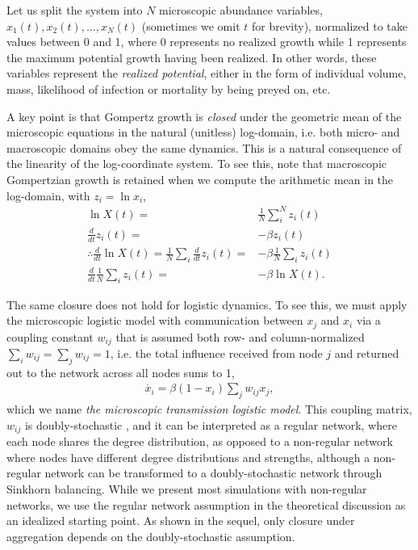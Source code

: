 \documentclass{article}
\begin{document}
Let us split the system into $N$ microscopic abundance variables, $x_1(t), x_2(t), ..., x_N(t)$ (sometimes we omit $t$ for brevity), normalized to take values between 0 and 1, where 0 represents no realized growth while 1 represents the maximum potential growth having been realized. In other words, these variables represent the \textit{realized potential}, either in the form of individual volume, mass, likelihood of infection or mortality by being preyed on, etc. 

A key point is that Gompertz growth is \emph{closed} under the geometric mean of the microscopic equations in the natural (unitless) log-domain, i.e. both micro- and macroscopic domains obey the same dynamics. This is a natural consequence of the linearity of the log-coordinate system. To see this, note that macroscopic Gompertzian growth is retained when we compute the arithmetic mean in the log-domain, with $z_i = \ln x_i$, 
\begin{align}
\ln X(t) =& \frac{1}{N}\sum_i^N z_i(t)\\
\frac{d}{dt}z_i(t) =&-\beta z_i(t)\\
\therefore\frac{d}{dt}\ln X(t) = \frac{1}{N}\sum_i\frac{d}{dt}z_i(t) =& -\beta \frac{1}{N}\sum_iz_i(t)\\
\frac{d}{dt}\frac{1}{N}\sum_iz_i(t) =& -\beta \ln X(t).
\end{align}

The same closure does not hold for logistic dynamics. To see this, we must apply the microscopic logistic model with communication between $x_j$ and $x_i$ via a coupling constant $w_{ij}$ that is assumed both row- and column-normalized  $\sum_i w_{ij}=\sum_j w_{ij}=1$, i.e. the total influence received from node $j$ and returned out to the network across all nodes sums to 1,
\begin{align}
  \label{eq:microLogisticEpidemic}
  \dot{x_i} = \beta(1 - x_i)\sum_j w_{ij}x_j,
\end{align} 
which we name \emph{the microscopic transmission logistic model}.
This coupling matrix, $w_{ij}$ is doubly-stochastic \cite{sinkhorn1967concerning}, and it can be interpreted as a regular network, where each node shares the degree distribution, as opposed to a non-regular network where nodes have different degree distributions and strengths, although a non-regular network can be transformed to a doubly-stochastic network through Sinkhorn balancing. While we present most simulations with non-regular networks, we use the regular network assumption in the theoretical discussion as an idealized starting point. As shown in the sequel, only closure under aggregation depends on the doubly-stochastic assumption.
\end{document}
